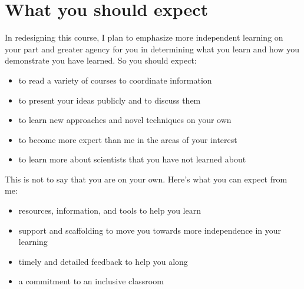 \documentclass[letterpaper,10pt,english]{jupyterBook}
\begin{document}
\section{What you should expect}
\label{\detokenize{content/0_course/syllabus:what-you-should-expect}}
\sphinxAtStartPar
In redesigning this course, I plan to emphasize more independent learning on your part and greater agency for you in determining what you learn and how you demonstrate you have learned. So you should expect:
\begin{itemize}
\item {} 
\sphinxAtStartPar
to read a variety of courses to coordinate information

\item {} 
\sphinxAtStartPar
to present your ideas publicly and to discuss them

\item {} 
\sphinxAtStartPar
to learn new approaches and novel techniques on your own

\item {} 
\sphinxAtStartPar
to become more expert than me in the areas of your interest

\item {} 
\sphinxAtStartPar
to learn more about scientists that you have not learned about

\end{itemize}

\sphinxAtStartPar
This is not to say that you are on your own. Here’s what you can expect from me:
\begin{itemize}
\item {} 
\sphinxAtStartPar
resources, information, and tools to help you learn

\item {} 
\sphinxAtStartPar
support and scaffolding to move you towards more independence in your learning

\item {} 
\sphinxAtStartPar
timely and detailed feedback to help you along

\item {} 
\sphinxAtStartPar
a commitment to an inclusive classroom

\end{itemize}
\end{document}
